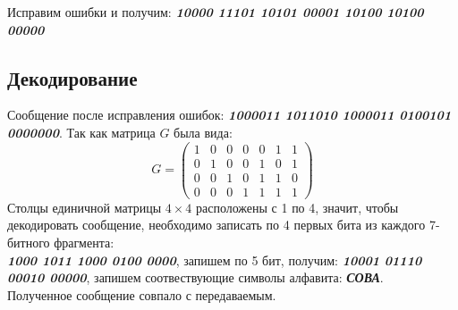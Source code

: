 \documentclass[a5paper, 10pt]{article}
\theoremstyle{definition}
\theoremstyle{plain}
\theoremstyle{remark}
\begin{document}
Исправим ошибки и получим:  \textbf{\textit{10000 11101 10101 00001 10100 10100 00000}}

\subsection{Декодирование}
Сообщение после исправления ошибок:   \textbf{\textit{1000011 1011010 1000011 0100101 0000000}}.
Так как матрица $G$ была вида:
\begin{equation}
G = 
\begin{pmatrix}
1 & 0 & 0 & 0 & 0 & 1 & 1\\
0 & 1 & 0 & 0 & 1 & 0 & 1\\
0 & 0 & 1 & 0 & 1 & 1 & 0\\
0 & 0 & 0 & 1 & 1 & 1 & 1
\end{pmatrix}
\end{equation}
Столцы единичной матрицы $4 \times 4$ расположены с 1 по 4, значит, чтобы декодировать сообщение, необходимо записать по 4 первых бита из каждого 7-битного фрагмента:\\
\textbf{\textit{1000 1011 1000 0100 0000}}, запишем по 5 бит, получим: \textbf{\textit{10001 01110 00010 00000}}, запишем соотвествующие символы алфавита: \textbf{\textit{СОВА}}.\\
Полученное сообщение совпало с передаваемым.


\newpage
\end{document}
